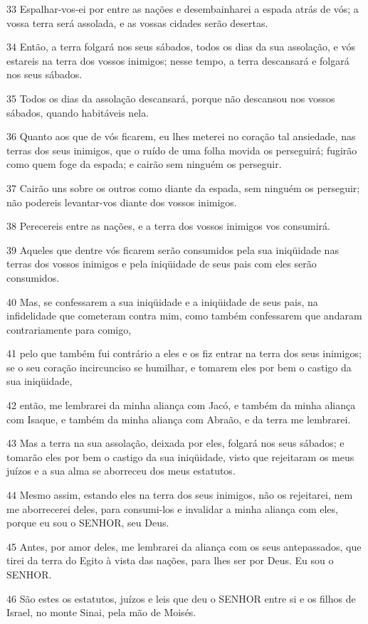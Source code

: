 \par 33 Espalhar-vos-ei por entre as nações e desembainharei a espada atrás de vós; a vossa terra será assolada, e as vossas cidades serão desertas.
\par 34 Então, a terra folgará nos seus sábados, todos os dias da sua assolação, e vós estareis na terra dos vossos inimigos; nesse tempo, a terra descansará e folgará nos seus sábados.
\par 35 Todos os dias da assolação descansará, porque não descansou nos vossos sábados, quando habitáveis nela.
\par 36 Quanto aos que de vós ficarem, eu lhes meterei no coração tal ansiedade, nas terras dos seus inimigos, que o ruído de uma folha movida os perseguirá; fugirão como quem foge da espada; e cairão sem ninguém os perseguir.
\par 37 Cairão uns sobre os outros como diante da espada, sem ninguém os perseguir; não podereis levantar-vos diante dos vossos inimigos.
\par 38 Perecereis entre as nações, e a terra dos vossos inimigos vos consumirá.
\par 39 Aqueles que dentre vós ficarem serão consumidos pela sua iniqüidade nas terras dos vossos inimigos e pela iniqüidade de seus pais com eles serão consumidos.
\par 40 Mas, se confessarem a sua iniqüidade e a iniqüidade de seus pais, na infidelidade que cometeram contra mim, como também confessarem que andaram contrariamente para comigo,
\par 41 pelo que também fui contrário a eles e os fiz entrar na terra dos seus inimigos; se o seu coração incircunciso se humilhar, e tomarem eles por bem o castigo da sua iniqüidade,
\par 42 então, me lembrarei da minha aliança com Jacó, e também da minha aliança com Isaque, e também da minha aliança com Abraão, e da terra me lembrarei.
\par 43 Mas a terra na sua assolação, deixada por eles, folgará nos seus sábados; e tomarão eles por bem o castigo da sua iniqüidade, visto que rejeitaram os meus juízos e a sua alma se aborreceu dos meus estatutos.
\par 44 Mesmo assim, estando eles na terra dos seus inimigos, não os rejeitarei, nem me aborrecerei deles, para consumi-los e invalidar a minha aliança com eles, porque eu sou o SENHOR, seu Deus.
\par 45 Antes, por amor deles, me lembrarei da aliança com os seus antepassados, que tirei da terra do Egito à vista das nações, para lhes ser por Deus. Eu sou o SENHOR.
\par 46 São estes os estatutos, juízos e leis que deu o SENHOR entre si e os filhos de Israel, no monte Sinai, pela mão de Moisés.

